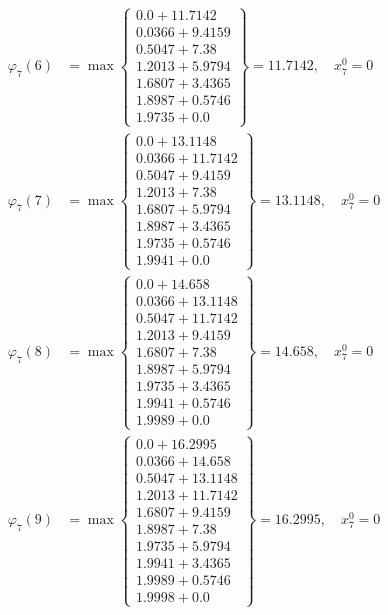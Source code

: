 \documentclass{article}
\begin{document}
\begin{align*}
  
  
  
\varphi_{7}(6) &= \max \left\{ \begin{array}{c}
0.0 + 11.7142 \\
 0.0366 + 9.4159 \\
 0.5047 + 7.38 \\
 1.2013 + 5.9794 \\
 1.6807 + 3.4365 \\
 1.8987 + 0.5746 \\
 1.9735 + 0.0
\end{array} \right\}=11.7142,\quad x_{7}^0=0\\
  
  
  
  
\varphi_{7}(7) &= \max \left\{ \begin{array}{c}
0.0 + 13.1148 \\
 0.0366 + 11.7142 \\
 0.5047 + 9.4159 \\
 1.2013 + 7.38 \\
 1.6807 + 5.9794 \\
 1.8987 + 3.4365 \\
 1.9735 + 0.5746 \\
 1.9941 + 0.0
\end{array} \right\}=13.1148,\quad x_{7}^0=0\\
  
  
  
  
\varphi_{7}(8) &= \max \left\{ \begin{array}{c}
0.0 + 14.658 \\
 0.0366 + 13.1148 \\
 0.5047 + 11.7142 \\
 1.2013 + 9.4159 \\
 1.6807 + 7.38 \\
 1.8987 + 5.9794 \\
 1.9735 + 3.4365 \\
 1.9941 + 0.5746 \\
 1.9989 + 0.0
\end{array} \right\}=14.658,\quad x_{7}^0=0\\
  
  
  
  
\varphi_{7}(9) &= \max \left\{ \begin{array}{c}
0.0 + 16.2995 \\
 0.0366 + 14.658 \\
 0.5047 + 13.1148 \\
 1.2013 + 11.7142 \\
 1.6807 + 9.4159 \\
 1.8987 + 7.38 \\
 1.9735 + 5.9794 \\
 1.9941 + 3.4365 \\
 1.9989 + 0.5746 \\
 1.9998 + 0.0
\end{array} \right\}=16.2995,\quad x_{7}^0=0\\
  

\end{align*}
\end{document}
